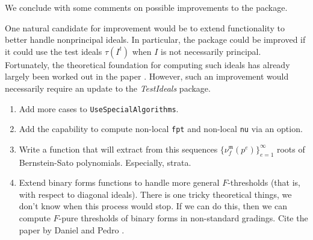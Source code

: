 \documentclass{amsart}
\newcommand{\idealm}{\mathfrak{m}}
\begin{document}
We conclude with some comments on possible improvements to the package.

One natural candidate for improvement would be to extend functionality to better handle nonprincipal ideals.  In particular, the package could be improved if it could use the test ideals $\tau(I^t)$ when $I$ is not necessarily principal.  Fortunately, the theoretical foundation for computing such ideals has already largely been worked out in the paper \cite{SchwedeTuckerTestIdealsOfNonPrincipal}. However, such an improvement would necessarily require an update to the \emph{TestIdeals} package.

\begin{enumerate}
\item Add more cases to {\tt UseSpecialAlgorithms}.
\item Add the capability to compute non-local {\tt fpt} and non-local {\tt nu} via an option.
\item Write a function that will extract from this sequences $\{ \nu_f^{\idealm}(p^e) \}_{e=1}^{\infty}$ roots of Bernstein-Sato polynomials.  Especially, strata.

\item Extend binary forms functions to handle more general $F$-thresholds (that is, with respect to diagonal ideals).  There is one tricky theoretical things, we don't know when this process would stop.  If we can do this, then we can compute $F$-pure thresholds of binary forms in non-standard gradings.  Cite the paper by Daniel and Pedro \cite{HernandezTeixeiraFThresholdFunctions}.
\end{enumerate}




\end{document}
